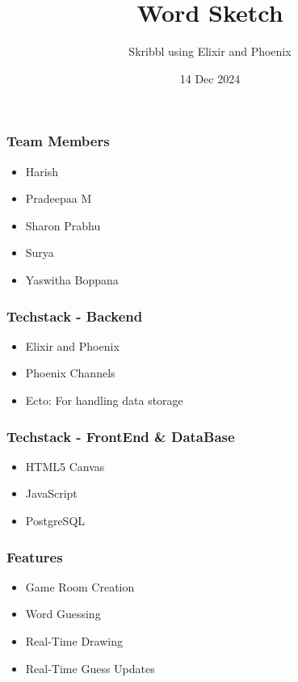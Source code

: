 \documentclass{beamer}
\title{Word Sketch}
\subtitle{Skribbl using Elixir and Phoenix}
\date{14 Dec 2024}
\begin{document}
\begin{frame}
    \titlepage
\end{frame}


\begin{frame}
    \frametitle{Team Members}
    \begin{itemize}
        \item Harish
        \item Pradeepaa M
        \item Sharon Prabhu
        \item Surya
        \item Yaswitha Boppana
    \end{itemize}
\end{frame}

\begin{frame}
    \frametitle{Techstack - Backend}
    \begin{itemize}
        \item Elixir and Phoenix
        \vspace{1 mm}
        \item Phoenix Channels
        \vspace{1 mm}
        \item Ecto: For handling data storage
    \end{itemize}
\end{frame}

\begin{frame}
    \frametitle{Techstack - FrontEnd \& DataBase}
    \begin{itemize}
        \item HTML5 Canvas
        \vspace{1 mm}
        \item JavaScript
        \vspace{1 mm}
        \item PostgreSQL
    \end{itemize}
\end{frame}

\begin{frame}
    \frametitle{Features}
    \begin{itemize}
        \item Game Room Creation
        \vspace{1 mm}
        \item Word Guessing
        \vspace{1 mm}
        \item Real-Time Drawing
        \vspace{1 mm}
        \item Real-Time Guess Updates
    \end{itemize}
\end{frame}
\end{document}

